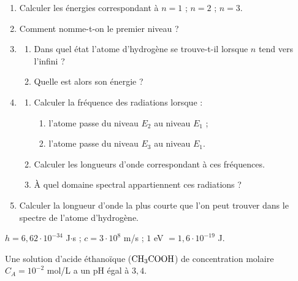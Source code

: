 \documentclass[11pt]{article}
\begin{document}
\begin{enumerate}
  \item Calculer les énergies correspondant à $n = 1$ ; $n = 2$ ; $n = 3$.
  \item Comment nomme-t-on le premier niveau ?
  \item \begin{enumerate}[label=\alph*.]
    \item Dans quel état l'atome d'hydrogène se trouve-t-il lorsque $n$ tend vers l'infini ?
    \item Quelle est alors son énergie ?
  \end{enumerate}
  \item \begin{enumerate}[label=\alph*.]
    \item Calculer la fréquence des radiations lorsque :
    \begin{enumerate}[label=a\textsubscript{\arabic*}.]
      \item l'atome passe du niveau $E_2$ au niveau $E_1$ ;
      \item l'atome passe du niveau $E_3$ au niveau $E_1$.
    \end{enumerate}
    \item Calculer les longueurs d'onde correspondant à ces fréquences.
    \item À quel domaine spectral appartiennent ces radiations ?
  \end{enumerate}
  \item Calculer la longueur d'onde la plus courte que l'on peut trouver dans le spectre de l'atome d'hydrogène.
\end{enumerate}
\noindent $h = 6{,}62\cdot10^{-34}$ J$\cdot$s ; $c = 3\cdot10^8$ m/s ; $1$ eV $= 1{,}6\cdot10^{-19}$ J.

Une solution d'acide éthanoïque ($\mathrm{CH_3COOH}$) de concentration molaire $C_A = 10^{-2}$ mol/L a un pH égal à $3{,}4$.
\end{document}
